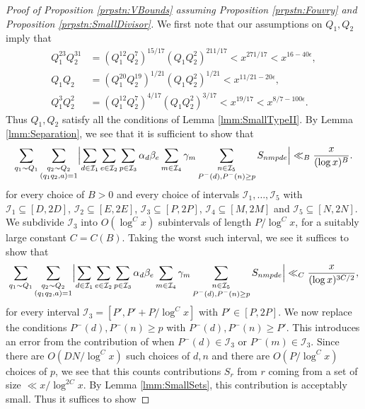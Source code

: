 \documentclass[10pt]{amsart}
\theoremstyle{plain}
\numberwithin{equation}{section}
\begin{document}
\begin{proof}[Proof of Proposition \ref{prpstn:VBounds} assuming Proposition \ref{prpstn:Fouvry} and Proposition \ref{prpstn:SmallDivisor}] We first note that our assumptions on $Q_1,Q_2$ imply that
\begin{align*}
Q_1^{23}Q_2^{31}&=(Q_1^{12} Q_2^{7})^{15/17} (Q_1 Q_2^2)^{211/17}<x^{271/17}<x^{16-40\epsilon},\\
Q_1Q_2&=(Q_1^{20} Q_2^{19})^{1/21} (Q_1 Q_2^2)^{1/21}<x^{11/21-20\epsilon},\\
Q_1^3 Q_2^2&=(Q_1^{12} Q_2^{7})^{4/17} (Q_1 Q_2^2)^{3/17}<x^{19/17}<x^{8/7-100\epsilon}.
\end{align*}
Thus $Q_1,Q_2$ satisfy all the conditions of Lemma \ref{lmm:SmallTypeII}. By Lemma \ref{lmm:Separation}, we see that it is sufficient to show that
\[
\sum_{q_1\sim Q_1}\sum_{\substack{ q_2\sim Q_2\\ (q_1q_2,a)=1}}\Bigl|\sum_{d\in \mathcal{I}_1}\sum_{e\in\mathcal{I}_2}\sum_{p\in\mathcal{I}_3}\alpha_{d}\beta_e\sum_{m\in\mathcal{I}_4}\gamma_m \sum_{\substack{n\in \mathcal{I}_5\\ P^-(d),P^-(n)\ge p}}S_{n m p d e}\Bigr|\ll_B \frac{x}{(\log{x})^B}.
\]
for every choice of $B>0$ and every choice of intervals $\mathcal{I}_1,\dots,\mathcal{I}_5$ with $\mathcal{I}_1\subseteq[D,2D]$, $\mathcal{I}_2\subseteq[E,2E]$, $\mathcal{I}_3\subseteq[P,2P]$, $\mathcal{I}_4\subseteq[M,2M]$ and $\mathcal{I}_5\subseteq[N,2N]$. We subdivide $\mathcal{I}_3$ into $O(\log^C{x})$ subintervals of length $P/\log^C{x}$, for a suitably large constant $C=C(B)$. Taking the worst such interval, we see it suffices to show that
\[
\sum_{q_1\sim Q_1}\sum_{\substack{ q_2\sim Q_2\\ (q_1q_2,a)=1}}\Bigl|\sum_{d\in \mathcal{I}_1}\sum_{e\in\mathcal{I}_2}\sum_{p\in\mathcal{I}_3}\alpha_{d}\beta_e\sum_{m\in\mathcal{I}_4}\gamma_m \sum_{\substack{n\in \mathcal{I}_5\\ P^-(d),P^-(n)\ge p}}S_{n m p d e}\Bigr|\ll_C \frac{x}{(\log{x})^{3C/2}},
\]
for every interval $\mathcal{I}_3=[P',P'+P/\log^{C}{x}]$ with $P'\in[P,2P]$. We now replace the conditions $P^-(d),P^-(n)\ge p$ with $P^-(d),P^-(n)\ge P'$. This introduces an error from the contribution of when $P^-(d)\in\mathcal{I}_3$ or $P^-(m)\in\mathcal{I}_3$. Since there are $O(DN/\log^{C}{x})$ such choices of $d,n$ and there are $O(P/\log^{C}{x})$ choices of $p$, we see that this counts contributions $S_{r}$ from $r$ coming from a set of size $\ll x/\log^{2C}{x}$. By Lemma \ref{lmm:SmallSets}, this contribution is acceptably small. Thus it suffices to show

\end{proof}
\end{document}
